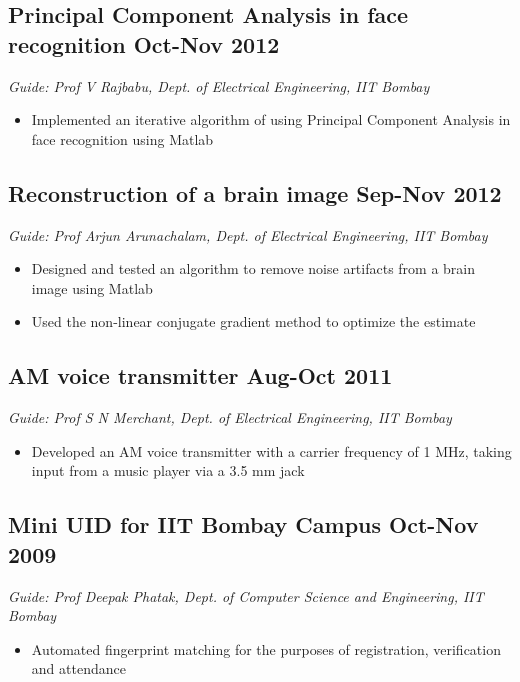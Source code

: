 \documentclass[12pt]{article}
\begin{document}
\subsection*{Principal Component Analysis in face recognition \hfill  Oct-Nov 2012}
\emph{Guide: Prof V Rajbabu, Dept. of Electrical Engineering, IIT Bombay}  
\begin{itemize}
\item Implemented an iterative algorithm of using Principal Component Analysis in face recognition using Matlab
\end{itemize}

\subsection*{Reconstruction of a brain image \hfill  Sep-Nov 2012}
\emph{Guide: Prof Arjun Arunachalam, Dept. of Electrical Engineering, IIT Bombay}  
\begin{itemize}
\item Designed and tested an algorithm to remove noise artifacts from a brain image using Matlab
\item Used the non-linear conjugate gradient method to optimize the estimate
\end{itemize}

\subsection*{AM voice transmitter \hfill Aug-Oct 2011}
\emph{Guide: Prof S N Merchant, Dept. of Electrical Engineering, IIT Bombay}
\begin{itemize} 
\item Developed an AM voice transmitter with a carrier frequency of 1 MHz, taking input from a music player via a 3.5 mm jack
\end{itemize}


\subsection*{Mini UID for IIT Bombay Campus \hfill  Oct-Nov 2009}
\emph{Guide: Prof Deepak Phatak, Dept. of Computer Science and Engineering, IIT Bombay} 
\begin{itemize}
\item Automated fingerprint matching for the purposes of registration, verification and attendance
\end{itemize}
\end{document}
